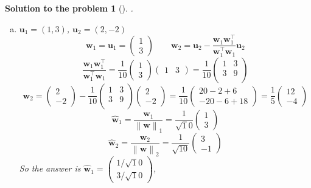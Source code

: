 \documentclass[12pt,a4]{article}
\newtheorem{solution}{Solution to the problem}
\newcommand{\bu}{{\mathbf u}}
\newcommand{\bw}{{\mathbf w}}
\newcommand{\norm}[1]{\left\lVert#1\right\rVert}
\begin{document}
\begin{solution}[]\rm .
\begin{enumerate}[(a)]
\item $\bu_1=(1,3)$, $\bu_2=(2,-2)$
\[
\bw_1 = \bu_1 =
\begin{pmatrix} 
1 \\ 3
\end{pmatrix}
\qquad
\bw_2 = \bu_2 - \frac{\bw_1\bw_1^\top}{\bw_1^\top\bw_1}\bu_2
\]
\[
\frac{\bw_1\bw_1^\top}{\bw_1^\top\bw_1} =
\frac{1}{10} 
\begin{pmatrix} 
1 \\ 3
\end{pmatrix}
\begin{pmatrix} 
1 & 3
\end{pmatrix}
=
\frac{1}{10} 
\begin{pmatrix} 
1 & 3 \\
3 & 9 \\
\end{pmatrix}
\]
\[
\bw_2 =
\begin{pmatrix} 
2 \\ -2
\end{pmatrix}
-
\frac{1}{10} 
\begin{pmatrix} 
1 & 3 \\
3 & 9 \\
\end{pmatrix}
\begin{pmatrix} 
2 \\ -2
\end{pmatrix} =
\frac{1}{10} 
\begin{pmatrix}
20 -2 + 6 \\-20  - 6 + 18 
\end{pmatrix} =
\frac{1}{5} 
\begin{pmatrix}
12 \\ -4
\end{pmatrix} 
\]
\[
\hat \bw_1 = \frac{\bw_1}{\norm \bw_1} = 
\frac{1}{\sqrt 10} 
\begin{pmatrix} 
1 \\ 3
\end{pmatrix}
\]
\[
\hat \bw_2 = \frac{\bw_2}{\norm \bw_2} = 
\frac{1}{\sqrt {10}}
\begin{pmatrix} 
3 \\ -1
\end{pmatrix}
\]
So the answer is $\hat \bw_1 =
\begin{pmatrix}  1/\sqrt 10 \\ 3/\sqrt 10\end{pmatrix}$,

\end{enumerate}
\end{solution}
\end{document}
